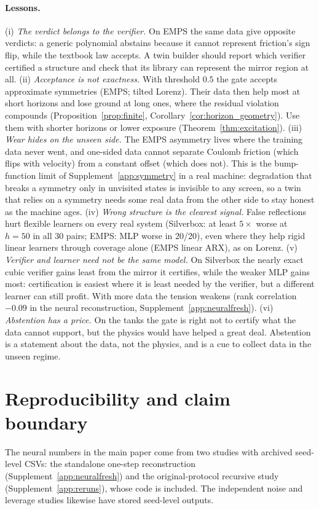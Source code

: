 \paragraph{Lessons.}
(i) \emph{The verdict belongs to the verifier.} On EMPS the same data give opposite verdicts: a generic polynomial abstains because it cannot represent friction's sign flip, while the textbook law accepts. A twin builder should report which verifier certified a structure and check that its library can represent the mirror region at all.
(ii) \emph{Acceptance is not exactness.} With threshold $0.5$ the gate accepts approximate symmetries (EMPS; tilted Lorenz). Their data then help most at short horizons and lose ground at long ones, where the residual violation compounds (Proposition~\ref{prop:finite}, Corollary~\ref{cor:horizon_geometry}). Use them with shorter horizons or lower exposure (Theorem~\ref{thm:excitation}).
(iii) \emph{Wear hides on the unseen side.} The EMPS asymmetry lives where the training data never went, and one-sided data cannot separate Coulomb friction (which flips with velocity) from a constant offset (which does not). This is the bump-function limit of Supplement~\ref{app:symmetry} in a real machine: degradation that breaks a symmetry only in unvisited states is invisible to any screen, so a twin that relies on a symmetry needs some real data from the other side to stay honest as the machine ages.
(iv) \emph{Wrong structure is the clearest signal.} False reflections hurt flexible learners on every real system (Silverbox: at least $5\times$ worse at $h=50$ in all 30 pairs; EMPS: MLP worse in 20/20), even where they help rigid linear learners through coverage alone (EMPS linear ARX), as on Lorenz.
(v) \emph{Verifier and learner need not be the same model.} On Silverbox the nearly exact cubic verifier gains least from the mirror it certifies, while the weaker MLP gains most: certification is easiest where it is least needed by the verifier, but a different learner can still profit. With more data the tension weakens (rank correlation $-0.09$ in the neural reconstruction, Supplement~\ref{app:neuralfresh}).
(vi) \emph{Abstention has a price.} On the tanks the gate is right not to certify what the data cannot support, but the physics would have helped a great deal. Abstention is a statement about the data, not the physics, and is a cue to collect data in the unseen regime.

\section{Reproducibility and claim boundary}\label{app:repro}
The neural numbers in the main paper come from two studies with archived seed-level CSVs: the standalone one-step reconstruction (Supplement~\ref{app:neuralfresh}) and the original-protocol recursive study (Supplement~\ref{app:reruns}), whose code is included. The independent noise and leverage studies likewise have stored seed-level outputs.

